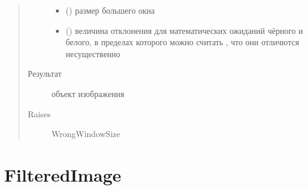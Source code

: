 \documentclass[letterpaper,10pt,russian]{sphinxmanual}
\begin{document}
\begin{fulllineitems}
\begin{fulllineitems}
\begin{quote}
\begin{description}
\begin{itemize}
\item {} 
 () \textendash{} размер большего окна

\item {} 
 () \textendash{} величина отклонения для математических ожиданий чёрного и белого, в пределах которого можно считать         , что они отличются несущественно

\end{itemize}

\item[{Результат}] \leavevmode
{\hyperref[\detokenize{BaseImage:core.LabImage}]{}} \textendash{} объект изображения

\item[{Raises}] \leavevmode
WrongWindowSize

\end{description}\end{quote}

\end{fulllineitems}


\end{fulllineitems}



\section{FilteredImage}
\label{\detokenize{FilteredImage:filteredimage}}\label{\detokenize{FilteredImage::doc}}
\end{document}
